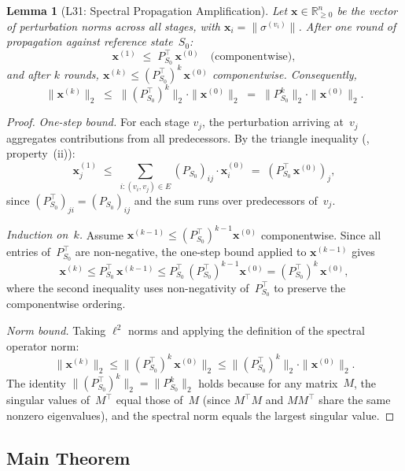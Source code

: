 \documentclass[11pt,a4paper]{article}
\newtheorem{lemma}[theorem]{Lemma}
\theoremstyle{definition}
\newcommand{\specnorm}[1]{\|#1\|_2}
\newcommand{\propmat}{P}
\newcommand{\propmatS}{\propmat_{S_0}}
\newcommand{\bbR}{\mathbb{R}}
\begin{document}
\begin{lemma}[L31: Spectral Propagation Amplification]\label{lem:spectral-amplify}
Let $\mathbf{x} \in \bbR_{\geq 0}^n$ be the vector of perturbation norms
across all stages, with $\mathbf{x}_i = \|\sigma^{(v_i)}\|$.  After one
round of propagation against reference state~$S_0$:
\[
  \mathbf{x}^{(1)} \;\leq\; \propmatS^\top\, \mathbf{x}^{(0)}
  \quad\text{(componentwise)},
\]
and after $k$ rounds, $\mathbf{x}^{(k)} \leq (\propmatS^\top)^k\,
\mathbf{x}^{(0)}$ componentwise.  Consequently,
\[
  \|\mathbf{x}^{(k)}\|_2 \;\leq\;
  \specnorm{(\propmatS^\top)^k} \cdot \|\mathbf{x}^{(0)}\|_2
  \;=\; \specnorm{\propmatS^k} \cdot \|\mathbf{x}^{(0)}\|_2.
\]
\end{lemma}

\begin{proof}
\emph{One-step bound.}  For each stage $v_j$, the perturbation arriving
at~$v_j$ aggregates contributions from all predecessors.  By the triangle
inequality (, property~(ii)):
\[
  \mathbf{x}^{(1)}_j
  \;\leq\; \sum_{i : (v_i, v_j) \in E}
    (\propmatS)_{ij} \cdot \mathbf{x}^{(0)}_i
  \;=\; (\propmatS^\top \,\mathbf{x}^{(0)})_j,
\]
since $(\propmatS^\top)_{ji} = (\propmatS)_{ij}$ and the sum runs over
predecessors of~$v_j$.

\emph{Induction on~$k$.}  Assume $\mathbf{x}^{(k-1)} \leq
(\propmatS^\top)^{k-1} \mathbf{x}^{(0)}$ componentwise.  Since all entries
of~$\propmatS^\top$ are non-negative, the one-step bound applied to
$\mathbf{x}^{(k-1)}$ gives
\[
  \mathbf{x}^{(k)}
  \leq \propmatS^\top \,\mathbf{x}^{(k-1)}
  \leq \propmatS^\top\, (\propmatS^\top)^{k-1} \mathbf{x}^{(0)}
  = (\propmatS^\top)^k \,\mathbf{x}^{(0)},
\]
where the second inequality uses non-negativity of~$\propmatS^\top$ to
preserve the componentwise ordering.

\emph{Norm bound.}  Taking $\ell^2$ norms and applying the definition of
the spectral operator norm:
\[
  \|\mathbf{x}^{(k)}\|_2
  \leq \|(\propmatS^\top)^k \,\mathbf{x}^{(0)}\|_2
  \leq \specnorm{(\propmatS^\top)^k} \cdot \|\mathbf{x}^{(0)}\|_2.
\]
The identity $\specnorm{(\propmatS^\top)^k} = \specnorm{\propmatS^k}$ holds
because for any matrix~$M$, the singular values of~$M^\top$ equal those of~$M$
(since $M^\top M$ and $M M^\top$ share the same nonzero eigenvalues), and the
spectral norm equals the largest singular value.
\end{proof}

\subsection{Main Theorem}
\end{document}
